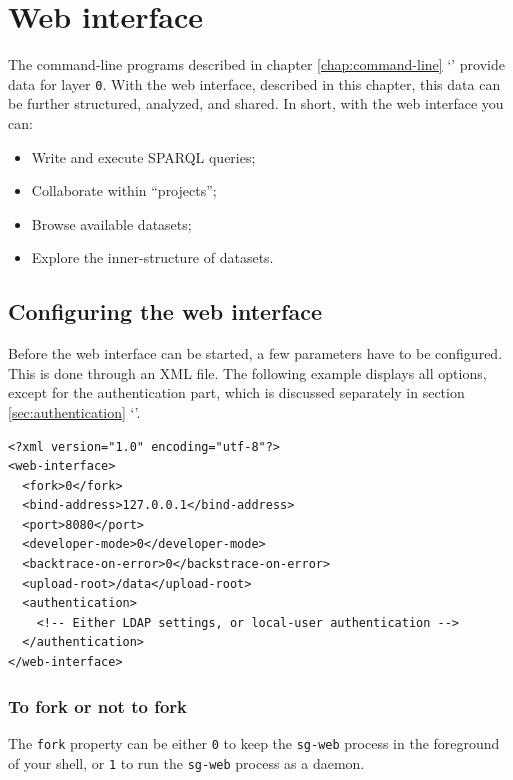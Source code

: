 \chapter{Web interface}
\label{chap:web-interface}

  The command-line programs described in chapter \ref{chap:command-line}
  {\color{LinkGray}`'} provide data for layer
  \texttt{0}.  With the web interface, described in this chapter, this
  data can be further structured, analyzed, and shared.  In short, with the
  web interface you can:
  \begin{itemize}
  \item Write and execute SPARQL queries;
  \item Collaborate within ``projects'';
  \item Browse available datasets;
  \item Explore the inner-structure of datasets.
  \end{itemize}

\section{Configuring the web interface}
\label{sec:configuring-sg-web}

  Before the web interface can be started, a few parameters have to be
  configured.  This is done through an XML file.  The following example
  displays all options, except for the authentication part, which is
  discussed separately in section \ref{sec:authentication}
  {\color{LinkGray}`'}.

\begin{siderules}
\begin{verbatim}
<?xml version="1.0" encoding="utf-8"?>
<web-interface>
  <fork>0</fork>
  <bind-address>127.0.0.1</bind-address>
  <port>8080</port>
  <developer-mode>0</developer-mode>
  <backtrace-on-error>0</backstrace-on-error>
  <upload-root>/data</upload-root>
  <authentication>
    <!-- Either LDAP settings, or local-user authentication -->
  </authentication>
</web-interface>
\end{verbatim}
\end{siderules}

\subsection{To fork or not to fork}

  The \texttt{fork} property can be either \texttt{0} to keep the
  \texttt{sg-web} process in the foreground of your shell, or
  \texttt{1} to run the \texttt{sg-web} process as a daemon.

